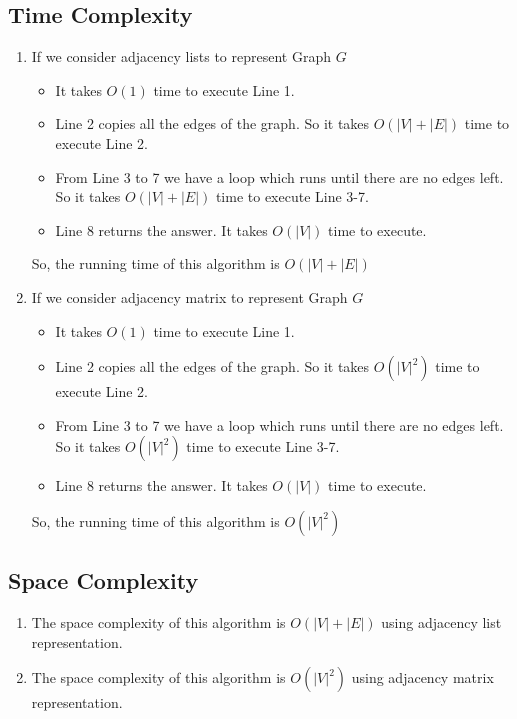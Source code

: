 \documentclass[12pt, a4paper]{article}
\begin{document}
	\subsection{Time Complexity}
	\begin{enumerate}
		\item If we consider adjacency lists to represent Graph ${G}$
		\begin{itemize}
			\item It takes ${O(1)}$ time to execute Line 1.
			\item Line 2 copies all the edges of the graph. So it takes ${O(|V| + |E|)}$ time to execute Line 2.
			\item From Line 3 to 7 we have a loop which runs until there are no edges left. So it takes ${O(|V| + |E|)}$ time to execute Line 3-7.
			\item Line 8 returns the answer. It takes ${O(|V|)}$ time to execute.
		\end{itemize} 
		So, the running time of this algorithm is ${O(|V| + |E|)}$
		
		\item If we consider adjacency matrix to represent Graph ${G}$
		\begin{itemize}
			\item It takes ${O(1)}$ time to execute Line 1.
			\item Line 2 copies all the edges of the graph. So it takes ${O\left(|V|^2\right)}$ time to execute Line 2.
			\item From Line 3 to 7 we have a loop which runs until there are no edges left. So it takes ${O\left(|V|^2\right)}$ time to execute Line 3-7.
			\item Line 8 returns the answer. It takes ${O(|V|)}$ time to execute.
		\end{itemize} 
		So, the running time of this algorithm is ${O\left(|V|^2\right)}$
	\end{enumerate}
	\subsection{Space Complexity}
	\begin{enumerate}
		\item The space complexity of this algorithm is ${O(|V| + |E|)}$ using adjacency list representation.
		\item The space complexity of this algorithm is ${O\left(|V|^2\right)}$ using adjacency matrix representation.
	\end{enumerate}
	
\end{document}
